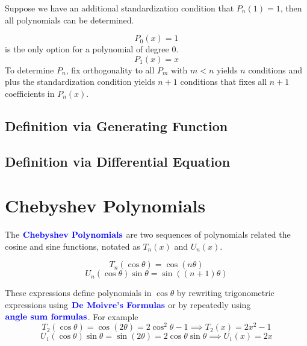 \documentclass[12pt]{scrartcl}
\begin{document}
\begin{definition}

\end{definition}

\begin{note}
    Suppose we have an additional standardization condition that $P_n(1) = 1$, then all polynomials can be determined.
\end{note}

\begin{lemma}
    \[P_0(x) = 1\]
    is the only option for a polynomial of degree $0$.
    \[P_1(x) = x\]
    To determine $P_n$, fix orthogonality to all $P_m$ with $m < n$ yields $n$
    conditions and plus the standardization condition yields $n + 1$ conditions
    that fixes all $n + 1$ coefficients in $P_n(x)$.
\end{lemma}

\subsection{Definition via Generating Function}

\subsection{Definition via Differential Equation}

\section{Chebyshev Polynomials}

\begin{definition}
    The $\textbf{\color{blue} Chebyshev Polynomials}$ are two sequences of polynomials related the cosine and sine functions, notated as $T_n(x)$ and $U_n(x)$.

    \[T_n(\cos \theta) = \cos(n \theta)\]
    \[U_n(\cos\theta)\sin\theta = \sin((n+1)\theta)\]
\end{definition}

\begin{lemma}
    These expressions define polynomials in $\cos \theta$ by rewriting trigonometric expressions using $\textbf{\color{blue} De Moivre's Formulas}$ or by repeatedly using $\textbf{\color{blue} angle sum formulas}$. For example
    \[T_2(\cos \theta) = \cos(2\theta) = 2\cos^2\theta - 1 \implies T_2(x) = 2x^2 -1\]
    \[U_1(\cos\theta)\sin\theta = \sin(2\theta) = 2\cos\theta\sin\theta \implies U_1(x) = 2x\]
\end{lemma}
\end{document}
